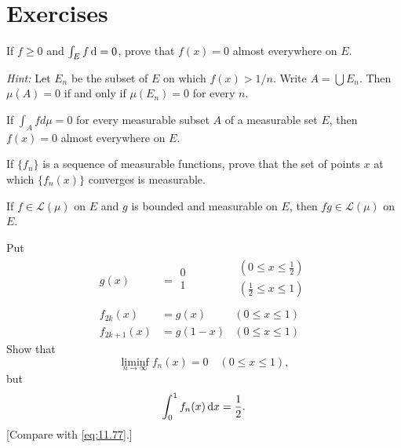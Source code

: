 
\section{Exercises}

\begin{myexercise}
    \label{ex:11.1}
    If $f \geq 0$ and $\int_E f \d = 0$, prove that $f(x) = 0$ almost everywhere on $E$.

    \emph{Hint:} Let $E_n$ be the subset of $E$ on which $f(x) > 1/n$.
    Write $A = \bigcup E_n$.
    Then $\mu(A)= 0$ if and only if $\mu(E_n)= 0$ for every $n$.
\end{myexercise}


\begin{myexercise}
    \label{ex:11.2}
    If $\int_A f d \mu = 0$ for every measurable subset $A$ of a measurable set $E$, then $f(x) = 0$ almost everywhere on $E$.
\end{myexercise}


\begin{myexercise}
    \label{ex:11.3}
    If $\{f_n\}$ is a sequence of measurable functions, prove that the set of points $x$ at which $\{f_n(x)\}$ converges is measurable.
\end{myexercise}


\begin{myexercise}
    \label{ex:11.4}
    If $f \in \mathscr{L}(\mu)$ on $E$ and $g$ is bounded and measurable on $E$, then $fg \in \mathscr{L}(\mu)$ on $E$.
\end{myexercise}


\begin{myexercise}
    \label{ex:11.5}
    Put
    \begin{align*}
        g(x)             & =
        \begin{array}{l}
            0 \\
            1 \\
        \end{array} &
        \begin{array}{l}
            (0 \leq x \leq \frac{1}{2}) \\
            (\frac{1}{2} \leq x \leq 1) \\
        \end{array}                     \\
        f_{2k}(x)        & = g(x)   & (0 \leq x \leq 1) \\
        f_{2k+1}(x)      & = g(1-x) & (0 \leq x \leq 1)
    \end{align*}
    Show that
    \begin{equation*}
        \liminf_{n \to \infty} f_n(x) = 0
        \quad
        (0 \leq x \leq 1),
    \end{equation*}
    but
    \begin{equation*}
        \int_{0}^{1} f_n(x) \d x = \frac{1}{2}.
    \end{equation*}
    [Compare with \eqref{eq:11.77}.]
\end{myexercise}


